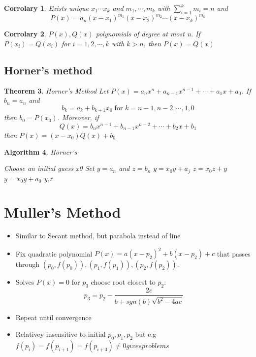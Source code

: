 \documentclass[12pt]{article}
\newtheorem{theorem}{Theorem}[subsection]
\newtheorem{cor}[theorem]{Corrolary}
\newtheorem{alg}[theorem]{Algorithm}
\begin{document}
\begin{cor}
	Exists unique $x_1 \cdots x_k$ and $m_1,\cdots, m_k$ with $\sum_{i=1}^k m_i = n$ and $$P(x) = a_n(x-x_1)^{m_1}(x-x_2)^{m_2}\cdots (x-x_k)^{m_k}$$
\end{cor}

\begin{cor}
$P(x), Q(x)$ polynomials of  degree at most n. If $P(x_i) = Q(x_i)$ for $i = 1,2,\cdots, k$ with $k>n$, then $P(x) = Q(x)$	
\end{cor}


\subsection{Horner's method}
\begin{theorem} {Horner's Method}
\newline Let $P(x) = a_nx^n +a_{n-1}x^{n-1} + \cdots +a_1x + a_0$. If $b_n = a_n$ and $$b_k = a_k +b_{k+1}x_0 \; \text{for $k = n-1, n-2, \cdots, 1,0$}$$
then $b_0 = P(x_0)$. Moreover, if 
$$ Q(x) = b_nx^{n-1} + b_{n-1}x^{n-2} + \cdots + b_2x + b_1$$
then $P(x) = (x - x_0)Q(x) + b_0$
\end{theorem}

\begin{alg}{Horner's }
	\begin{algorithmic}
	Choose an initial guess x0
	\State Set $y = a_n$ and $z = b_n$
	\State $y = x_0y + a_j$
	\State $z = x_0z + y$
	\EndFor	
	\State $y = x_0y + a_0$
	\State \Return y,z
	\end{algorithmic}
	
\end{alg}


\section{Muller's Method}
\begin{itemize}
	\item Similar to Secant method, but parabola instead of line
	\item Fix quadratic polynomial $P(x) = a(x-p_2)^2 +b(x - p_2) + c$ that passes through $(p_0,f(p_0)),(p_1,f(p_1)),(p_2,f(p_2))$.
	\item Solves $P(x) = 0$ for $p_3$ choose root closest to $p_2$:
	$$p_3 = p_2 - \frac{2c}{b + sgn(b)\sqrt{b^2 - 4ac}}$$
	\item Repeat until convergence
	\item Relativey insensitive to initial $p_0,p_1,p_2$ but e.g $f(p_i) = f(p_{i+1}) = f(p_{i+3}) \neq 0 gives problems$
\end{itemize}

\end{document}
